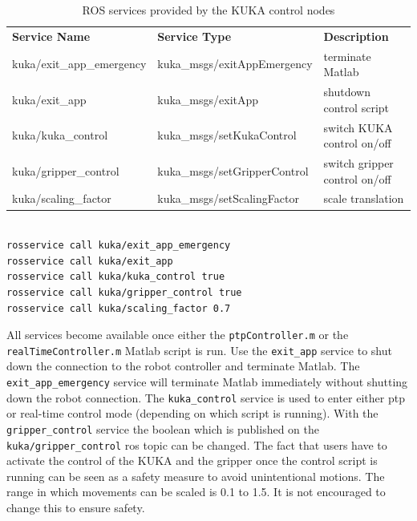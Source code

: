 \documentclass[headsepline,footinclude=false,fontsize=11pt,paper=a4,listof=totoc,bibliography=totoc,BCOR=12mm,DIV=14]{scrbook}
\begin{document}
\begin{table}[h]
\centering
\begin{tabular}{lll}
\textbf{Service Name}     & \textbf{Service Type}        & \textbf{Description}          \\
kuka/exit\_app\_emergency & kuka\_msgs/exitAppEmergency  & terminate Matlab              \\
kuka/exit\_app            & kuka\_msgs/exitApp           & shutdown control script       \\
kuka/kuka\_control        & kuka\_msgs/setKukaControl    & switch KUKA control on/off    \\
kuka/gripper\_control     & kuka\_msgs/setGripperControl & switch gripper control on/off \\
kuka/scaling\_factor      & kuka\_msgs/setScalingFactor  & scale translation     
\end{tabular}
\caption{ROS services provided by the KUKA control nodes}
\label{tab:services}
\end{table}

\begin{lstlisting}[language=bash, caption={Usage of \gls{ros} services}, captionpos=b, label=code:services]

rosservice call kuka/exit_app_emergency
rosservice call kuka/exit_app
rosservice call kuka/kuka_control true
rosservice call kuka/gripper_control true
rosservice call kuka/scaling_factor 0.7

\end{lstlisting}

All services become available once either the \texttt{ptpController.m} or the \texttt{realTimeController.m} Matlab script is run. Use the \texttt{exit\_app} service to shut down the connection to the robot controller and terminate Matlab. The \texttt{exit\_app\_emergency} service will terminate Matlab immediately without shutting down the robot connection. The \texttt{kuka\_control} service is used to enter either \gls{ptp} or real-time control mode (depending on which script is running). With the \texttt{gripper\_control} service the boolean which is published on the \texttt{kuka/gripper\_control} \gls{ros} topic can be changed. The fact that users have to activate the control of the KUKA and the gripper once the control script is running can be seen as a safety measure to avoid unintentional motions. The range in which movements can be scaled is 0.1 to 1.5. It is not encouraged to change this to ensure safety.
\end{document}
